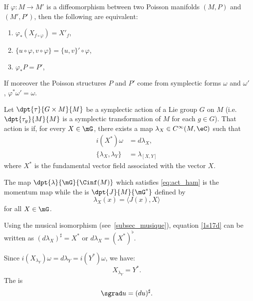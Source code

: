\begin{theorem}\label{tho:equiv_Poisson}
If $\varphi\colon M\to M'$ is a diffeomorphism between two Poisson manifolds $(M,P)$ and $(M',P')$, then the following are equivalent:
\begin{enumerate}
\item $\varphi_*(X_{f\circ\varphi})=X'_f$,
\item\label{ite_equivii} $\{u\circ\varphi,v\circ\varphi\}=\{u,v\}'\circ\varphi$,
\item $\varphi_*P=P'$,
\end{enumerate}
If moreover the Poisson structures $P$ and $P'$ come from symplectic forms $\omega$ and $\omega'$, $\varphi^*\omega'=\omega$.
\end{theorem}

\begin{definition}
Let $\dpt{\tau}{G\times M}{M}$ be a symplectic action of a Lie group $G$ on $M$ (i.e. $\dpt{\tau_g}{M}{M}$ is a symplectic transformation of $M$ for each $g\in G$). That action is  if, for every $X\in\mG$, there exists a map $\lambda_X\in C^{\infty}(M,\eC)$ such that
\begin{subequations}\label{eq:act_ham}
\begin{align}
  i(X^*)\omega&=d\lambda_X,\label{1s17d}\\
  \{\lambda_X,\lambda_Y\}&=\lambda_{[X,Y]}\label{eq:hamil}
 \end{align}
\end{subequations}
where $X^*$ is the fundamental vector field associated with the vector $X$.
\end{definition}

\begin{definition}
The map $\dpt{\lambda}{\mG}{\Cinf(M)}$ which satisfies \eqref{eq:act_ham} is the  momentum map while the  is $\dpt{J}{M}{\mG^*}$ defined by
   \begin{equation} \label{eq:defmomm ap}
     \lambda_X(x)=\langle J(x),X\rangle
   \end{equation}
for all $X\in\mG$.
\label{def:app_mom_mom_duale}
\end{definition}
Using the musical isomorphism (see~\ref{subsec_musique}), equation \eqref{1s17d} can be written as $(d\lambda_X)^{\sharp}=X^*$ or $d\lambda_X=(X^*)^{\flat}$.

Since $i(X_{\lambda_Y})\omega=d\lambda_Y=i(Y^*)\omega$, we have:
\begin{equation} \label{eq_XlambdaYs}
   X_{\lambda_Y}=Y^*.
\end{equation}
The  is
\[
  \sgrad u=(du)^{\sharp}.
\]

